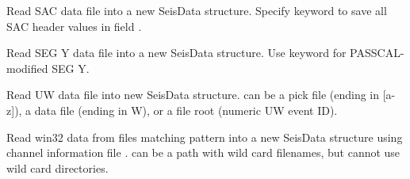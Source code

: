 \documentclass[letterpaper,11pt,english]{sphinxmanual}
\begin{document}

\begin{fulllineitems}
\label{\detokenize{src/Formats/fileformats:rsac}}
\end{fulllineitems}


Read SAC data file  into a new SeisData structure. Specify keyword  to save all SAC header values in field .

\begin{fulllineitems}
\label{\detokenize{src/Formats/fileformats:readsegy}}
\end{fulllineitems}


Read SEG Y data file  into a new SeisData structure. Use keyword  for PASSCAL-modified SEG Y.

\begin{fulllineitems}
\label{\detokenize{src/Formats/fileformats:readuw}}
\end{fulllineitems}


Read UW data file into new SeisData structure.  can be a pick file (ending in {[}a-z{]}), a data file (ending in W), or a file root (numeric UW event ID).

\begin{fulllineitems}
\label{\detokenize{src/Formats/fileformats:readwin32}}
\end{fulllineitems}


Read win32 data from files matching pattern  into a new SeisData structure using channel information file .  can be a path with wild card filenames, but cannot use wild card directories.
\end{document}

